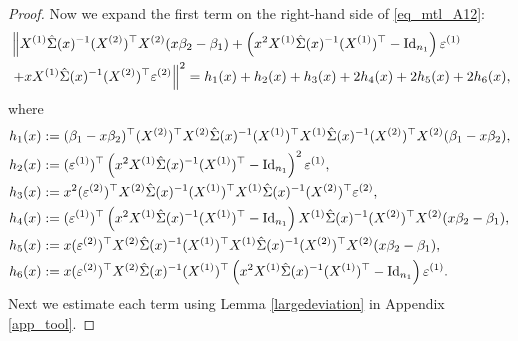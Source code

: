 \begin{proof}
 Now we expand the first term on the right-hand side of \eqref{eq_mtl_A12}:
 \begin{align}
 & \left\| X^{(1)} \hat\Sigma(x)^{-1} (X^{(2)})^\top X^{(2)} (x\beta_2-\beta_1)+ \left(x^2 X^{(1)}\hat \Sigma(x)^{-1} (X^{(1)})^\top-\operatorname{Id}_{n_1}\right)\varepsilon^{(1)} \right. \nonumber\\
		& \left. + x X^{(1)}\hat \Sigma(x)^{-1} (X^{(2)})^\top \varepsilon^{(2)} \right\|^2=h_1(x) + h_2(x) +h_3(x) + 2h_4(x) + 2h_5(x) + 2h_6(x) ,\label{expand_6}
 \end{align}
 where
 \begin{align*}
&h_1(x):=  (\beta_1-x\beta_2)^\top (X^{(2)})^\top X^{(2)}  \hat\Sigma(x)^{-1}  (X^{(1)})^\top X^{(1)} \hat\Sigma(x)^{-1} (X^{(2)})^\top X^{(2)} (\beta_1-x\beta_2)  ,\\
& h_2(x) := {(\varepsilon^{(1)})^\top \left(x^2 X^{(1)}\hat\Sigma(x)^{-1} (X^{(1)})^\top-\operatorname{Id}_{n_1}\right)^2\varepsilon^{(1)}}  ,\\
& h_3(x):=  x^2 { (\varepsilon^{(2)} )^\top X^{(2)} \hat\Sigma(x)^{-1}  (X^{(1)})^\top X^{(1)}\hat\Sigma(x)^{-1} (X^{(2)})^\top \varepsilon^{(2)}} , \\
& h_4(x):=  (\varepsilon^{(1)})^\top\left(x^2 X^{(1)}\hat\Sigma(x)^{-1} (X^{(1)})^\top-\operatorname{Id}_{n_1}\right) X^{(1)} \hat\Sigma(x)^{-1} (X^{(2)})^\top X^{(2)} (x\beta_2-\beta_1), \\
&h_5(x):=x (\varepsilon^{(2)})^\top X^{(2)}\hat\Sigma(x)^{-1} (X^{(1)})^\top X^{(1)} \hat\Sigma(x)^{-1} (X^{(2)})^\top X^{(2)} (x\beta_2-\beta_1),\\
&h_6(x):=x (\varepsilon^{(2)})^\top X^{(2)}\hat\Sigma(x)^{-1} (X^{(1)})^\top\left(x^2 X^{(1)}\hat\Sigma(x)^{-1} (X^{(1)})^\top-\operatorname{Id}_{n_1}\right)\varepsilon^{(1)}.
\end{align*}
Next we estimate each term using Lemma \ref{largedeviation} in Appendix \ref{app_tool}.


\end{proof}
